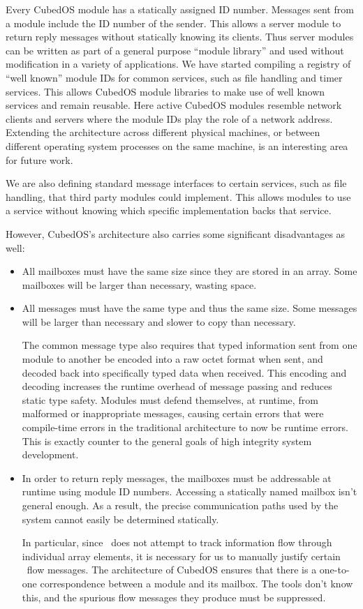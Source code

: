 Every CubedOS module has a statically assigned ID number. Messages sent from a module include
the ID number of the sender. This allows a server module to return reply messages without
statically knowing its clients. Thus server modules can be written as part of a general purpose
``module library'' and used without modification in a variety of applications. We have started
compiling a registry of ``well known'' module IDs for common services, such as file handling and
timer services. This allows CubedOS module libraries to make use of well known services and
remain reusable. Here active CubedOS modules resemble network clients and servers where the
module IDs play the role of a network address. Extending the architecture across different
physical machines, or between different operating system processes on the same machine, is an
interesting area for future work.

We are also defining standard message interfaces to certain services, such as file handling,
that third party modules could implement. This allows modules to use a service without knowing
which specific implementation backs that service.

However, CubedOS's architecture also carries some significant disadvantages as well:

\begin{itemize}
\item All mailboxes must have the same size since they are stored in an array. Some mailboxes
  will be larger than necessary, wasting space.

\item All messages must have the same type and thus the same size. Some messages will be larger
  than necessary and slower to copy than necessary.

  The common message type also requires that typed information sent from one module to another
  be encoded into a raw octet format when sent, and decoded back into specifically typed data
  when received. This encoding and decoding increases the runtime overhead of message passing
  and reduces static type safety. Modules must defend themselves, at runtime, from malformed or
  inappropriate messages, causing certain errors that were compile-time errors in the
  traditional architecture to now be runtime errors. This is exactly counter to the general
  goals of high integrity system development.

\item In order to return reply messages, the mailboxes must be addressable at runtime using
  module ID numbers. Accessing a statically named mailbox isn't general enough. As a result, the
  precise communication paths used by the system cannot easily be determined statically.

  In particular, since \SPARK\ does not attempt to track information flow through individual
  array elements, it is necessary for us to manually justify certain \SPARK\ flow messages. The
  architecture of CubedOS ensures that there is a one-to-one correspondence between a module and
  its mailbox. The tools don't know this, and the spurious flow messages they produce must be
  suppressed.
\end{itemize}

